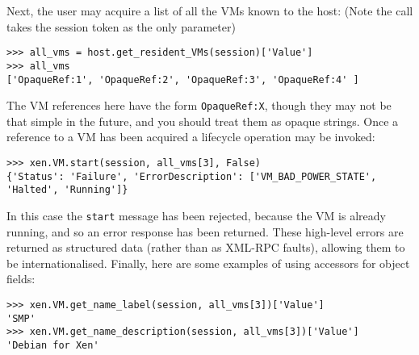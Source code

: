 Next, the user may acquire a list of all the VMs known to the host: (Note the
call takes the session token as the only parameter)

\begin{verbatim}
>>> all_vms = host.get_resident_VMs(session)['Value']
>>> all_vms
['OpaqueRef:1', 'OpaqueRef:2', 'OpaqueRef:3', 'OpaqueRef:4' ]
\end{verbatim}

The VM references here have the form {\tt OpaqueRef:X}, though they may not be 
that simple in the future, and you should treat them as opaque strings.  
Once a reference to a VM has been acquired a lifecycle operation may be invoked:

\begin{verbatim}
>>> xen.VM.start(session, all_vms[3], False)
{'Status': 'Failure', 'ErrorDescription': ['VM_BAD_POWER_STATE', 'Halted', 'Running']}
\end{verbatim}

In this case the {\tt start} message has been rejected, because the VM is
already running, and so an error response has been returned.  These high-level
errors are returned as structured data (rather than as XML-RPC faults),
allowing them to be internationalised.  Finally, here are some examples of
using accessors for object fields:

\begin{verbatim}
>>> xen.VM.get_name_label(session, all_vms[3])['Value']
'SMP'
>>> xen.VM.get_name_description(session, all_vms[3])['Value']
'Debian for Xen'
\end{verbatim}
